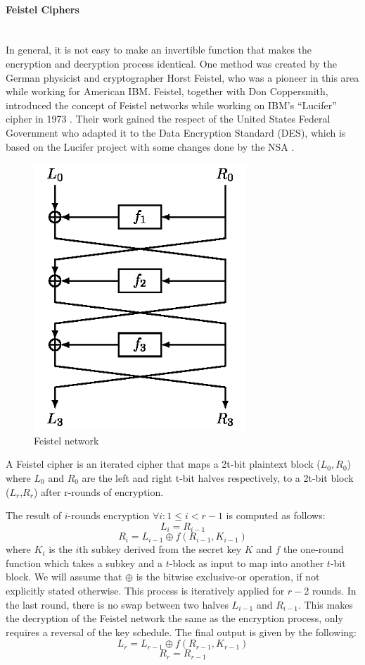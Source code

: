 \paragraph{Feistel Ciphers}\label{sec:feistel} \mbox{} \\
In general, it is not easy to make an invertible function that makes the encryption and decryption process identical. One method was created by the German physicist and cryptographer Horst Feistel, who was a pioneer in this area while working for American IBM. Feistel, together with Don Coppersmith, introduced the concept of Feistel networks while working on IBM's ``Lucifer'' cipher in 1973 \cite{feistel1973cryptography}. Their work gained the respect of the United States Federal Government who adapted it to the Data Encryption Standard (DES), which is based on the Lucifer project with some changes done by the NSA \cite{pub197746}.
\begin{figure}[h!]
	\centering
	\includegraphics[width=80mm]{./pics/fofKW.png}
	\caption{Feistel network}
	\label{Fig:FeistelNet}
\end{figure}
\begin{mydef}	
A Feistel cipher is an iterated cipher that maps a 2t-bit plaintext block ($L_{0},R_{0}$) where $L_{0}$ and $ R_{0}$ are the left and right t-bit halves respectively, to a 2t-bit block ($L_{r}$,$R_{r}$) after r-rounds of encryption.
\end{mydef}
The result of $i$-rounds encryption $\forall i : 1 \leq i < r - 1 $ is computed as follows:
$$ L_{i} = R_{i-1}$$
$$ R_{i} = L_{i-1} \oplus f(R_{i-1},K_{i-1})$$
where $K_{i}$ is the $i$th subkey derived from the secret key $K$ and $f$ the one-round function which takes a subkey and a $t$-block as input to map into another $t$-bit block. We will assume that $\oplus$ is the bitwise exclusive-or operation, if not explicitly stated otherwise. This process is iteratively applied for $r - 2$ rounds. In the last round, there is no swap between two halves $L_{i-1}$ and $R_{i-1}$. This makes the decryption of the Feistel network the same as the encryption process, only requires a reversal of the key schedule. The final output is given by the following: $$ L_{r} = L_{r-1} \oplus f(R_{r-1},K_{r-1})$$
$$R_{r} = R_{r-1}$$

